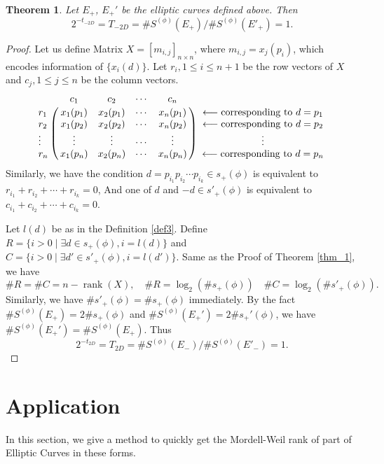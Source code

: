 \documentclass{amsart}
\numberwithin{equation}{section}
\theoremstyle{plain}
\newtheorem{thm_}[equation]{Theorem}
\theoremstyle{definition}
\newcommand{\thm}[1]{\begin{thm_}#1\end{thm_}}
\newcommand{\pf}[1]{\begin{proof}#1\end{proof}}
\DeclareMathOperator{\rank}{rank}
\begin{document}
\thm{ \label{thm_n2} Let $E_+$, $E_+'$ be the elliptic curves defined above. Then     $$2^{-t_{-2D}} = T_{-2D} = \# S^{(\phi)}(E_+)/\# S^{(\phi)}(E'_{+}) = 1.$$
}
\pf{
 Let us define Matrix $X = [m_{i,j}]_{n\times n}$, where $m_{i,j} = x_{j}(p_i)$, which encodes information of $\{x_{i}(d)\}$. Let $r_{i},1 \le i \le n+1$ be the row vectors of $X$ and $c_{j},1\le j \le n$ be the column vectors.
\begin{equation}\label{eq:array4}
\bordermatrix{%
       & c_1       & c_2     &\cdots     &c_n\cr
r_1    &x_{1}(p_1) & x_{2}(p_1) & \cdots  &x_{n}(p_1)\cr
r_2    &x_{1}(p_2) & x_{2}(p_2) & \cdots  &x_{n}(p_2)\cr
\vdots & \vdots    &\vdots   &\cdots     &\vdots\cr
r_n 		& x_{1}(p_n) & x_{2}(p_n) & \cdots  &x_{n}(p_n)
}
\begin{array}{c}
      \longleftarrow  \text{corresponding to $d = p_1$} \\
     \longleftarrow  \text{corresponding to $d = p_2$} \\
		\vdots  \\
	  \longleftarrow  \text{corresponding to $d = p_n$}\\
    \end{array}
\end{equation}
Similarly, we have the condition $d = p_{i_1}p_{i_2} \cdots p_{i_k}  \in s_+(\phi)$ is equivalent to $r_{i_1}+r_{i_2}+\cdots +r_{i_k}=0$, And one of $ d $ and $-d \in s'_+(\phi)$ is equivalent to $c_{i_1}+c_{i_2}+\cdots +c_{i_k}=0$.

 Let $l(d)$ be as in the Definition \ref{def3}. Define $R= \{i>0\mid \exists d \in s_+(\phi) , i = l(d) \}$ and $C = \{i>0 \mid \exists d' \in s'_+(\phi) , i = l(d') \}$. Same as the Proof of Theorem \ref{thm_1}, we have
$$\# R = \# C = n-\rank(X), \quad \# R = \log_{2}(\# s_+(\phi)) \quad \# C = \log_{2}(\# s'_+(\phi)).$$ Similarly, we have  $\# s'_+(\phi) = \# s_+(\phi)$ immediately. By the fact $\#  S^{(\phi)}(E_+) = 2 \# s_+(\phi)$ and $\# S^{({\phi})}({E_+'}) = 2 \# s_+'(\phi)$, we have $\# S^{({\phi})}({E_+'}) = \#  S^{(\phi)}(E_+)$. Thus
$$2^{-t_{2D}} = T_{2D} = \# S^{(\phi)}(E_-)/\# S^{(\phi)}(E'_{-}) = 1.$$
}

\section{Application}

In this section, we give a method to quickly get the Mordell-Weil rank of part of Elliptic Curves in these forms.
\end{document}
